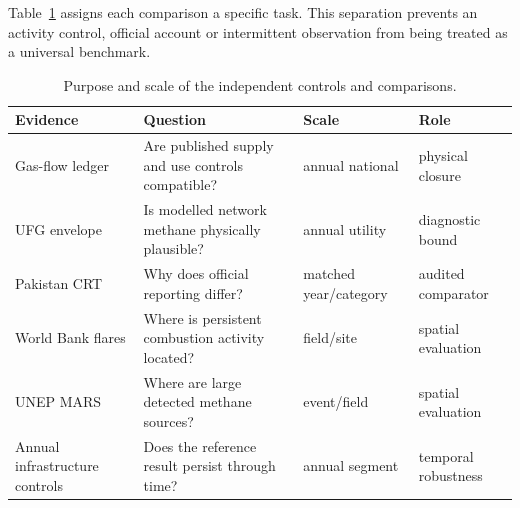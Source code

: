 Table~\ref{tab:evidence} assigns each comparison a specific task. This separation prevents an
activity control, official account or intermittent observation from being treated as a universal
benchmark.

\begin{table}[htbp]
\centering
\small
\begin{tabular}{@{}llll@{}}
\toprule
\textbf{Evidence} & \textbf{Question} & \textbf{Scale} & \textbf{Role} \\
\midrule
Gas-flow ledger & Are published supply and use controls compatible? & annual national & physical closure \\
UFG envelope & Is modelled network methane physically plausible? & annual utility & diagnostic bound \\
Pakistan CRT & Why does official reporting differ? & matched year/category & audited comparator \\
World Bank flares & Where is persistent combustion activity located? & field/site & spatial evaluation \\
UNEP MARS & Where are large detected methane sources? & event/field & spatial evaluation \\
Annual infrastructure controls & Does the reference result persist through time? & annual segment & temporal robustness \\
\bottomrule
\end{tabular}
\caption{Purpose and scale of the independent controls and comparisons.}
\label{tab:evidence}
\end{table}
